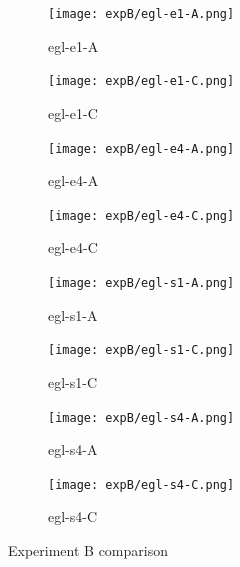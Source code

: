 \documentclass[twoside]{ctuthesis}
\theoremstyle{plain}
\theoremstyle{definition}
\theoremstyle{note}
\begin{document}
\begin{figure}[htbp]
	\centering
	
	\begin{subfigure}{0.45\textwidth}
		\texttt{[image: expB/egl-e1-A.png]}
		\caption{egl-e1-A}
		\label{fig:expB-e1-A}
	\end{subfigure}
	\hfill
	\begin{subfigure}{0.45\textwidth}
		\texttt{[image: expB/egl-e1-C.png]}
		\caption{egl-e1-C}
		\label{fig:expB-e1-C}
	\end{subfigure}
	
	\begin{subfigure}{0.45\textwidth}
		\texttt{[image: expB/egl-e4-A.png]}
		\caption{egl-e4-A}
		\label{fig:expB-e4-A}
	\end{subfigure}
	\hfill
	\begin{subfigure}{0.45\textwidth}
		\texttt{[image: expB/egl-e4-C.png]}
		\caption{egl-e4-C}
		\label{fig:expB-e4-C}
	\end{subfigure}
	
	\begin{subfigure}{0.45\textwidth}
		\texttt{[image: expB/egl-s1-A.png]}
		\caption{egl-s1-A}
		\label{fig:expB-s1-A}
	\end{subfigure}
	\hfill
	\begin{subfigure}{0.45\textwidth}
		\texttt{[image: expB/egl-s1-C.png]}
		\caption{egl-s1-C}
		\label{fig:expB-s1-C}
	\end{subfigure}
	
	\begin{subfigure}{0.45\textwidth}
		\texttt{[image: expB/egl-s4-A.png]}
		\caption{egl-s4-A}
		\label{fig:expB-s4-A}
	\end{subfigure}
	\hfill
	\begin{subfigure}{0.45\textwidth}
		\texttt{[image: expB/egl-s4-C.png]}
		\caption{egl-s4-C}
		\label{fig:expB-s4-C}
	\end{subfigure}
	
	\caption{Experiment B comparison}
	\label{fig:expB-comparison}
\end{figure}
\end{document}
